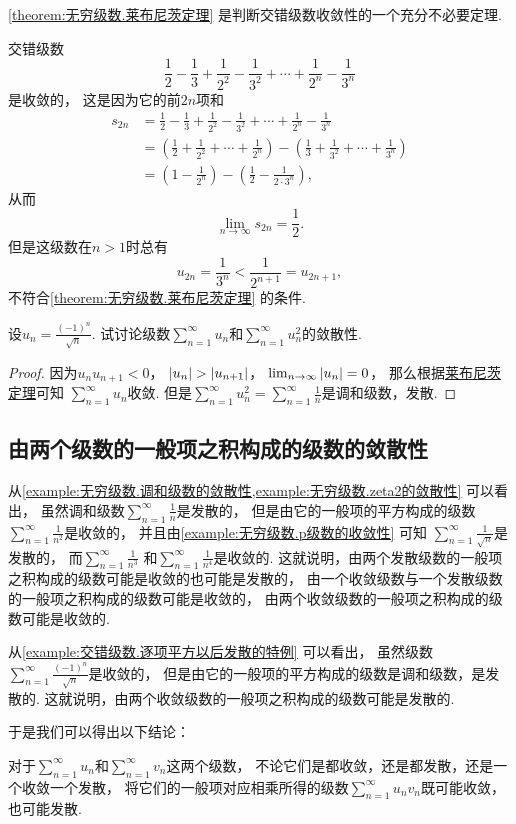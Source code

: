 \cref{theorem:无穷级数.莱布尼茨定理} 是判断交错级数收敛性的一个充分不必要定理.
\begin{example}
交错级数\[
	\frac{1}{2} - \frac{1}{3}
	+ \frac{1}{2^2} - \frac{1}{3^2}
	+ \dotsm + \frac{1}{2^n} - \frac{1}{3^n}
\]是收敛的，
这是因为它的前\(2n\)项和\begin{align*}
	s_{2n} &= \frac{1}{2} - \frac{1}{3}
	+ \frac{1}{2^2} - \frac{1}{3^2}
	+ \dotsm + \frac{1}{2^n} - \frac{1}{3^n} \\
	&= \left(\frac{1}{2} + \frac{1}{2^2} + \dotsm + \frac{1}{2^n}\right)
	- \left(\frac{1}{3} + \frac{1}{3^2} + \dotsm + \frac{1}{3^n}\right) \\
	&= \left(1 - \frac{1}{2^n}\right)
	- \left(\frac{1}{2} - \frac{1}{2\cdot3^n}\right),
\end{align*}
从而\[
	\lim_{n\to\infty} s_{2n} = \frac{1}{2}.
\]
但是这级数在\(n>1\)时总有\[
	u_{2n} = \frac{1}{3^n} < \frac{1}{2^{n+1}} = u_{2n+1},
\]不符合\cref{theorem:无穷级数.莱布尼茨定理} 的条件.
\end{example}

\begin{example}\label{example:交错级数.逐项平方以后发散的特例}
设\(u_n = \frac{(-1)^n}{\sqrt{n}}\).
试讨论级数\(\sum_{n=1}^\infty u_n\)和\(\sum_{n=1}^\infty u_n^2\)的敛散性.
\begin{proof}
因为\(u_n u_{n+1} < 0\)，
\(\abs{u_n} > \abs{u_{n+1}}\)，
\(\lim_{n\to\infty} \abs{u_n} = 0\)，
那么根据\hyperref[theorem:无穷级数.莱布尼茨定理]{莱布尼茨定理}可知
\(\sum_{n=1}^\infty u_n\)收敛.
但是\(\sum_{n=1}^\infty u_n^2
= \sum_{n=1}^\infty \frac{1}{n}\)是调和级数，发散.
\end{proof}
\end{example}

\subsection{由两个级数的一般项之积构成的级数的敛散性}
从\cref{example:无穷级数.调和级数的敛散性,example:无穷级数.zeta2的敛散性} 可以看出，
虽然调和级数\(\sum_{n=1}^\infty \frac1n\)是发散的，
但是由它的一般项的平方构成的级数\(\sum_{n=1}^\infty \frac1{n^2}\)是收敛的，
并且由\cref{example:无穷级数.p级数的收敛性} 可知
\(\sum_{n=1}^\infty \frac1{\sqrt{n}}\)是发散的，
而\(\sum_{n=1}^\infty \frac1{n^3}\)
和\(\sum_{n=1}^\infty \frac1{n^4}\)是收敛的.
这就说明，由两个发散级数的一般项之积构成的级数可能是收敛的也可能是发散的，
由一个收敛级数与一个发散级数的一般项之积构成的级数可能是收敛的，
由两个收敛级数的一般项之积构成的级数可能是收敛的.

从\cref{example:交错级数.逐项平方以后发散的特例} 可以看出，
虽然级数\(\sum_{n=1}^\infty \frac{(-1)^n}{\sqrt{n}}\)是收敛的，
但是由它的一般项的平方构成的级数是调和级数，是发散的.
这就说明，由两个收敛级数的一般项之积构成的级数可能是发散的.

于是我们可以得出以下结论：
\begin{proposition}
对于\(\sum_{n=1}^\infty u_n\)和\(\sum_{n=1}^\infty v_n\)这两个级数，
不论它们是都收敛，还是都发散，还是一个收敛一个发散，
将它们的一般项对应相乘所得的级数\(\sum_{n=1}^\infty u_n v_n\)既可能收敛，也可能发散.
\end{proposition}
